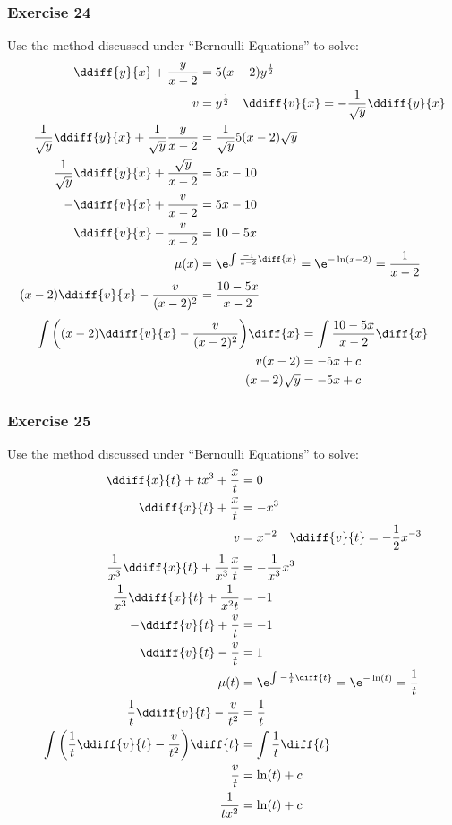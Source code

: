 \documentclass{math}
\begin{document}
\subsubsection*{Exercise 24}
Use the method discussed under ``Bernoulli Equations'' to solve:
\begin{align*}
  \ddiff{y}{x}+\frac{y}{x-2} &= 5(x-2)y^{\frac{1}{2}} \\
  v &= y^{\frac{1}{2}} \quad \ddiff{v}{x} = -\frac{1}{\sqrt{y}}\ddiff{y}{x} \\
  \frac{1}{\sqrt{y}}\ddiff{y}{x}+\frac{1}{\sqrt{y}}\frac{y}{x-2} &=
    \frac{1}{\sqrt{y}}5(x-2)\sqrt{y} \\
  \frac{1}{\sqrt{y}}\ddiff{y}{x}+\frac{\sqrt{y}}{x-2} &= 5x-10 \\
  -\ddiff{v}{x}+\frac{v}{x-2} &= 5x-10 \\
  \ddiff{v}{x}-\frac{v}{x-2} &= 10-5x \\
  \mu(x) &= \e^{\int\frac{-1}{x-2}\diff{x}} = \e^{-\ln(x-2)} = \frac{1}{x-2} \\
  (x-2)\ddiff{v}{x}-\frac{v}{(x-2)^2} &= \frac{10-5x}{x-2}
\end{align*}
\begin{align*}
  \int\bigg((x-2)\ddiff{v}{x}-\frac{v}{(x-2)^2}\bigg)\diff{x} &=
    \int\frac{10-5x}{x-2}\diff{x} \\
  v(x-2) &= -5x+c \\
  (x-2)\sqrt{y} &= -5x+c
\end{align*}

\subsubsection*{Exercise 25}
Use the method discussed under ``Bernoulli Equations'' to solve:
\begin{align*}
  \ddiff{x}{t}+tx^3+\frac{x}{t} &= 0 \\
  \ddiff{x}{t}+\frac{x}{t} &= -x^3 \\
  v &= x^{-2} \quad \ddiff{v}{t} = -\frac{1}{2}x^{-3} \\
  \frac{1}{x^3}\ddiff{x}{t}+\frac{1}{x^3}\frac{x}{t} &= -\frac{1}{x^3}{x^3} \\
  \frac{1}{x^3}\ddiff{x}{t}+\frac{1}{x^2t} &= -1 \\
  -\ddiff{v}{t}+\frac{v}{t} &= -1 \\
  \ddiff{v}{t}-\frac{v}{t} &= 1 \\
  \mu(t) &= \e^{\int-\frac{1}{t}\diff{t}} = \e^{-\ln(t)} = \frac{1}{t} \\
  \frac{1}{t}\ddiff{v}{t}-\frac{v}{t^2} &= \frac{1}{t} \\
  \int\bigg(\frac{1}{t}\ddiff{v}{t}-\frac{v}{t^2}\bigg)\diff{t} &=
    \int\frac{1}{t}\diff{t} \\
  \frac{v}{t} &= \ln(t)+c \\
  \frac{1}{tx^2} &= \ln(t)+c
\end{align*}
\end{document}
